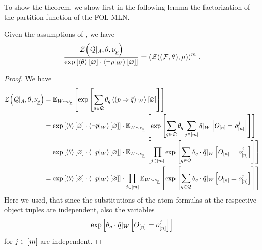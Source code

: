 To show the theorem, we show first in the following lemma the factorization of the partition function of the FOL MLN.

\begin{lemma}\label{lem:FOLpartitionfunctionfactorization}
	Given the assumptions of , we have
	\begin{align*}
		\frac{\mathcal{Z}{\left(\mathcal{Q} |_{A},\theta , \nu_{\underline{p}}\right)}}{\mathrm{exp}\left[\left\langle \theta\right\rangle \left[ \varnothing \right] \cdot \left\langle {\lnot p}|_{W}\right\rangle \left[ \varnothing \right]\right]} = \left(\mathcal{Z}{\left((\mathcal{F},\theta),\mu\right)}\right)^m \, .
	\end{align*}
\end{lemma}
\begin{proof}
	We have
	\begin{align*}
		\mathcal{Z}{\left(\mathcal{Q} |_{A},\theta , \nu_{\underline{p}}\right)} 
		&= \mathbb{E}_{W\sim\nu_{\underline{p}}}\left[
			 \mathrm{exp}\left[\sum_{q\in\mathcal{Q}}\theta_{q}\left\langle {(p\Rightarrow\tilde{q})}|_{W}\right\rangle \left[ \varnothing \right]\right] 
		\right] \\
		&= \mathrm{exp}\left[\left\langle \theta\right\rangle \left[ \varnothing \right] \cdot \left\langle {\lnot p}|_{W}\right\rangle \left[ \varnothing \right]\right] \cdot 
		\mathbb{E}_{W\sim\nu_{\underline{p}}}\left[
			 \mathrm{exp}\left[\sum_{q\in\mathcal{Q}}\theta_{q}  \sum_{j\in[m]} {\tilde{q}}|_{W} \left[O_{[n]} = o_{[n]}^{j}\right] \right]
		\right] \\
		&= \mathrm{exp}\left[\left\langle \theta\right\rangle \left[ \varnothing \right] \cdot \left\langle {\lnot p}|_{W}\right\rangle \left[ \varnothing \right]\right] \cdot 
		\mathbb{E}_{W\sim\nu_{\underline{p}}}\left[
			\prod_{j\in[m]} \mathrm{exp}\left[ \sum_{q\in\mathcal{Q}} \theta_{q} \cdot {\tilde{q}}|_{W} \left[O_{[n]} = o_{[n]}^{j}\right] \right]
		\right] \\
		&= \mathrm{exp}\left[\left\langle \theta\right\rangle \left[ \varnothing \right] \cdot \left\langle {\lnot p}|_{W}\right\rangle \left[ \varnothing \right]\right] \cdot 
			\prod_{j\in[m]}
			 \mathbb{E}_{W\sim\nu_{\underline{p}}}\left[
			 \mathrm{exp}\left[ \sum_{q\in\mathcal{Q}} \theta_{q} \cdot {\tilde{q}}|_{W} \left[O_{[n]} = o_{[n]}^{j}\right] \right]
		\right] \\
	\end{align*}
	Here we used, that since the substitutions of the atom formulas at the respective object tuples are independent, also the variables
		\[ \mathrm{exp}\left[\theta_{q}  \cdot {\tilde{q}}|_{W} \left[O_{[n]} = o_{[n]}^{j}\right]  \right] \]
	for $j\in[m]$ are independent.
	

\end{proof}
